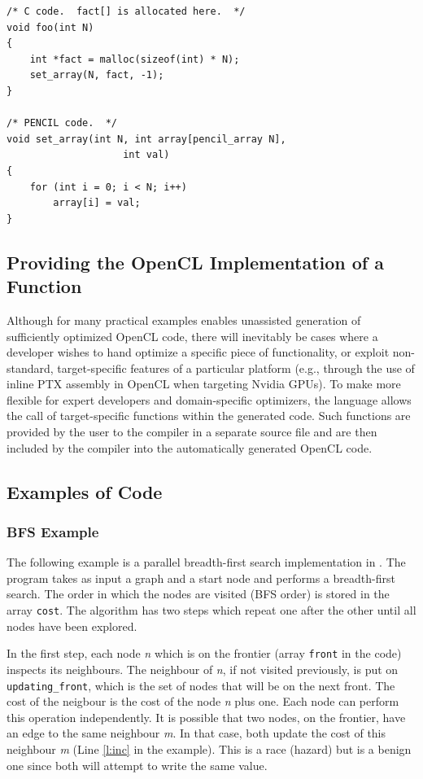 \begin{lstlisting}[language=pencil]
/* C code.  fact[] is allocated here.  */
void foo(int N)
{
    int *fact = malloc(sizeof(int) * N);
    set_array(N, fact, -1);
}

/* PENCIL code.  */
void set_array(int N, int array[pencil_array N],
                    int val)
{
    for (int i = 0; i < N; i++)
        array[i] = val;
}

\end{lstlisting}


\subsection{Providing the OpenCL Implementation of a \pencil Function}
Although for many practical examples \pencil enables unassisted
generation of sufficiently optimized OpenCL code,
there will inevitably be cases where a developer wishes
to hand optimize a specific piece of functionality, or exploit
non-standard, target-specific features of a particular platform (e.g.,
through the use of inline PTX assembly in OpenCL when targeting Nvidia
GPUs).
To make \pencil more flexible for expert developers and
domain-specific optimizers, the language allows the call of
target-specific functions within the generated code.
Such functions are provided by the user to the \pencil compiler
in a separate source file and are then included by the compiler
into the automatically generated OpenCL code.


\subsection{Examples of \pencil Code}

\subsubsection{BFS Example}


The following example is a parallel breadth-first search implementation
in \pencil.  The program takes as input a graph and a start node and
performs a breadth-first search.  The order in which the nodes are
visited (BFS order) is stored in the array \lstinline!cost!.  The algorithm has
two steps which repeat one after the other until all nodes have been explored.

In the first step, each node \emph{n} which is on the frontier (array \lstinline!front!
in the code) inspects its neighbours.  The neighbour of \emph{n}, if not visited previously,
is put on \lstinline!updating_front!, which is the set of nodes that will be on
the next front.  The cost of the neigbour is the cost of the node \emph{n} plus one.
Each node can perform this operation independently.  It is possible
that two nodes, on the frontier, have an edge to the same neighbour \emph{m}.  In that
case, both update the cost of this neighbour \emph{m} (Line \ref{l:inc} in the example).
This is a race (hazard) but is a benign one since both will attempt to
write the same value.


